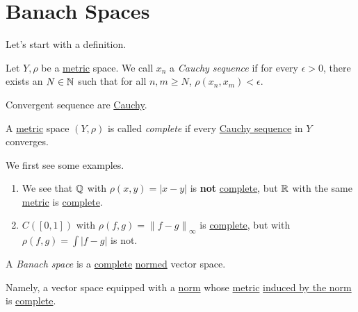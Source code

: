 \section{Banach Spaces}
Let's start with a definition.
\begin{definition}\label{def:Cauchy-sequence}
	Let \(Y, \rho \) be a \hyperref[def:metric]{metric} space. We call \(x_{n} \) a \emph{Cauchy sequence} if for every \(\epsilon >0\), there exists an
	\(N\in \mathbb{\MakeUppercase{n}} \) such that for all \(n, m\geq N\), \(\rho (x_{n} , x_{m} )< \epsilon \).
\end{definition}
\begin{note}
	Convergent sequence are \hyperref[def:Cauchy-sequence]{Cauchy}.
\end{note}

\begin{definition}[Complete]\label{def:complete}
	A \hyperref[def:metric]{metric} space \((Y, \rho )\) is called \emph{complete} if every \hyperref[def:Cauchy-sequence]{Cauchy sequence} in \(Y\) converges.
\end{definition}

\begin{eg}
	We first see some examples.
	\begin{enumerate}
		\item We see that \(\mathbb{\MakeUppercase{q}} \) with \(\rho (x, y) = \left\vert x - y \right\vert \) is \textbf{not} \hyperref[def:complete]{complete}, but \(\mathbb{\MakeUppercase{r}} \) with
		      the same \hyperref[def:metric]{metric} is \hyperref[def:complete]{complete}.
		\item \(C([0, 1])\) with \(\rho (f, g) = \left\lVert f-g\right\rVert _\infty \) is \hyperref[def:complete]{complete}, but with \(\rho (f, g) = \int \left\vert f-g \right\vert \) is not.
	\end{enumerate}
\end{eg}

\begin{definition}\label{def:Banach-space}
	A \emph{Banach space} is a \hyperref[def:complete]{complete} \hyperref[def:norm]{normed} vector space.
\end{definition}
\begin{remark}
	Namely, a vector space equipped with a \hyperref[def:norm]{norm} whose \hyperref[def:metric]{metric} \hyperref[induced-metric]{induced by the norm} is
	\hyperref[def:complete]{complete}.
\end{remark}

